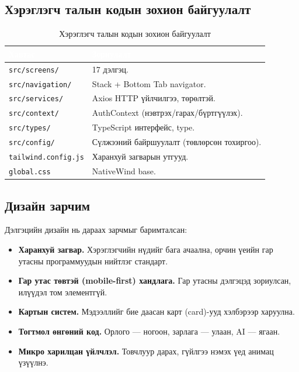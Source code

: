 \subsection{Хэрэглэгч талын кодын зохион байгуулалт}

\begin{table}[ht]
\centering
\footnotesize
\renewcommand{\arraystretch}{1.2}
\begin{tabular}{|l|p{8.5cm}|}
\hline
\rowcolor{darknavy}
\textcolor{white}{\textbf{Хавтас}} & \textcolor{white}{\textbf{Зориулалт}} \\ \hline
\texttt{src/screens/}      & 17 дэлгэц. \\ \hline
\texttt{src/navigation/}   & Stack + Bottom Tab navigator. \\ \hline
\texttt{src/services/}     & Axios HTTP үйлчилгээ, төрөлтэй. \\ \hline
\texttt{src/context/}      & AuthContext (нэвтрэх/гарах/бүртгүүлэх). \\ \hline
\texttt{src/types/}        & TypeScript интерфейс, type. \\ \hline
\texttt{src/config/}       & Сүлжээний байршуулалт (төвлөрсөн тохиргоо). \\ \hline
\texttt{tailwind.config.js} & Харанхуй загварын утгууд. \\ \hline
\texttt{global.css}        & NativeWind base. \\ \hline
\end{tabular}
\caption{Хэрэглэгч талын кодын зохион байгуулалт}
\label{tab:fe-layout}
\end{table}

\subsection{Дизайн зарчим}
Дэлгэцийн дизайн нь дараах зарчмыг баримталсан:
\begin{itemize}
    \item \textbf{Харанхуй загвар.} Хэрэглэгчийн нүдийг бага ачаална, орчин үеийн гар утасны программуудын нийтлэг стандарт.
    \item \textbf{Гар утас төвтэй (mobile-first) хандлага.} Гар утасны дэлгэцэд зориулсан, илүүдэл том элементгүй.
    \item \textbf{Картын систем.} Мэдээллийг бие даасан карт (card)-ууд хэлбэрээр харуулна.
    \item \textbf{Тогтмол өнгөний код.} Орлого --- ногоон, зарлага --- улаан, AI --- ягаан.
    \item \textbf{Микро харилцан үйлчлэл.} Товчлуур дарах, гүйлгээ нэмэх үед анимац үзүүлнэ.
\end{itemize}

